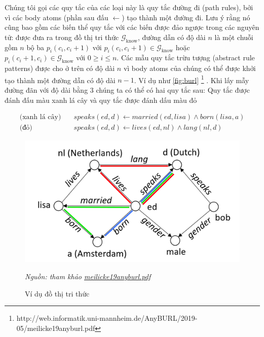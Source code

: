 
Chúng tôi gọi các quy tắc của các loại này là quy tắc đường đi (path rules), bởi vì các body atoms (phần sau đấu \(\gets\)) tạo thành một đường đi. Lưu ý rằng nó cũng bao gồm các biến thể quy tắc với các biến được đảo ngược trong các nguyên tử: được đưa ra trong đồ thị tri thức \(\mathcal{G}_{\text{know}}\), đường dẫn có độ dài \(n\) là một chuỗi gồm \(n\) bộ ba \(p_i (c_i, c_i + 1)\) với \(p_i (c_i, c_i + 1) \in \mathcal{G}_{\text{know}}\) hoặc \(p_i (c_i + 1, c_i) \in \mathcal{G}_{\text{know}}\) với \(0 \geq i \leq n\). Các mẫu quy tắc trừu tượng (abstract rule patterns) được cho ở trên có độ dài \(n\) vì body atoms của chúng có thể được khởi tạo thành một đường dẫn có độ dài \(n - 1\). Ví dụ như \autoref{fig:burl} \footnote{http://web.informatik.uni-mannheim.de/AnyBURL/2019-05/meilicke19anyburl.pdf}
. Khi lấy mẫy đường đãn với độ dài bằng 3 chúng ta có thể có hai quy tắc sau: Quy tắc được đánh đấu màu xanh lá cây và quy tắc được đánh dấu màu đỏ


\begin{equation*}
	\begin{aligned}
		\text{(xanh lá cây)} \quad & speaks(ed, d) \gets married(ed, lisa) \wedge born(lisa, a) \\
		\text{(đỏ)} \quad & speaks(ed, d) \gets lives(ed, nl) \wedge lang(nl, d)
	\end{aligned}
\end{equation*}


\begin{figure}[htp]
	\centering
	\includegraphics[width=12cm]{images/burl-ago.png}
	\caption{Ví dụ đồ thị tri thức} 
	\textit{Nguồn: tham khảo \href{http://web.informatik.uni-mannheim.de/AnyBURL/2019-05/meilicke19anyburl.pdf}{meilicke19anyburl.pdf}}
	\label{fig:burl}
\end{figure}

